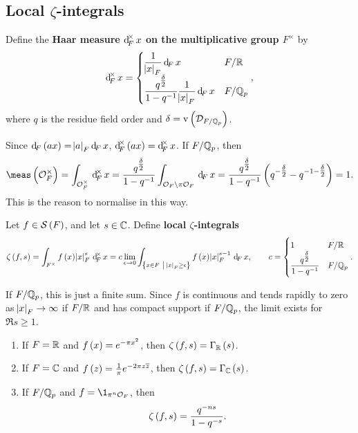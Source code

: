 \subsection{Local \texorpdfstring{$ \zeta $}{zeta}-integrals}


\begin{definition*}
Define the \textbf{Haar measure $ \dF^\times x $ on the multiplicative group $ F^\times $} by
$$ \dF^\times x =
\begin{cases}
\dfrac{1}{\abs{x}_F}\dF x & F / \RR \\
\dfrac{q^{\tfrac{\delta}{2}}}{1 - q^{-1}}\dfrac{1}{\abs{x}_F}\dF x & F / \QQ_p
\end{cases},
$$
where $ q $ is the residue field order and $ \delta = \v\br{\DDD_{F / \QQ_p}} $.
\end{definition*}

Since $ \dF\br{ax} = \abs{a}_F\dF x $, $ \dF^\times\br{ax} = \dF^\times x $. If $ F / \mathbb{Q}_p $, then
$$ \meas\br{\OOO_F^\times} = \intFX[\OOO_F^\times]{}{x} = \dfrac{q^{\tfrac{\delta}{2}}}{1 - q^{-1}}\intF[\OOO_F \setminus \pi\OOO_F]{}{x} = \dfrac{q^{\tfrac{\delta}{2}}}{1 - q^{-1}}\br{q^{-\tfrac{\delta}{2}} - q^{-1 - \tfrac{\delta}{2}}} = 1. $$
This is the reason to normalise in this way.

\begin{definition*}
Let $ f \in \SSS\br{F} $, and let $ s \in \mathbb{C} $. Define \textbf{local $ \zeta $-integrals}
$$ \zeta\br{f, s} = \intFX{f\br{x}\abs{x}_F^s}{x} = c\lim_{\epsilon \to 0} \intF[\cbr{x \in F \st \abs{x}_F \ge \epsilon}]{f\br{x}\abs{x}_F^{s - 1}}{x}, \qquad c =
\begin{cases}
1 & F / \RR \\
\dfrac{q^{\tfrac{\delta}{2}}}{1 - q^{-1}} & F / \QQ_p
\end{cases}.
$$
\end{definition*}

If $ F / \mathbb{Q}_p $, this is just a finite sum. Since $ f $ is continuous and tends rapidly to zero as $ \abs{x}_F \to \infty $ if $ F / \mathbb{R} $ and has compact support if $ F / \mathbb{Q}_p $, the limit exists for $ \Re s \ge 1 $.

\begin{proposition}
\label{prop:9.8}
\hfill
\begin{enumerate}
\item If $ F = \mathbb{R} $ and $ f\br{x} = e^{-\pi x^2} $, then $ \zeta\br{f, s} = \Gamma_\RR\br{s} $.
\item If $ F = \mathbb{C} $ and $ f\br{z} = \tfrac{1}{\pi}e^{-2\pi z\overline{z}} $, then $ \zeta\br{f, s} = \Gamma_\CC\br{s} $.
\item If $ F / \mathbb{Q}_p $ and $ f = \1_{\pi^n\OOO_F} $, then
$$ \zeta\br{f, s} = \dfrac{q^{-ns}}{1 - q^{-s}}. $$
\end{enumerate}
\end{proposition}

